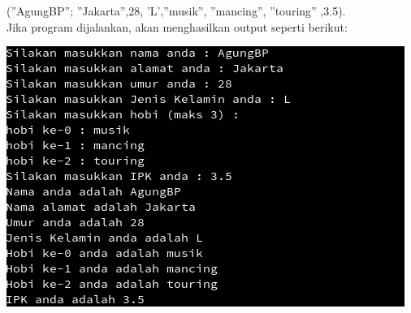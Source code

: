\documentclass[a4paper,12pt]{article}
\begin{document}
(”AgungBP”; ”Jakarta”,28, ’L’,”musik”, ”mancing”, ”touring” ,3.5).\\
Jika program dijalankan, akan menghasilkan output seperti berikut:
\begin{center}
    \includegraphics[scale=1]{prog12.png} 
\end{center}
\end{document}
